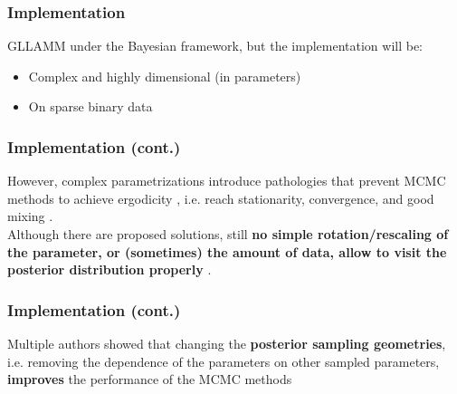 \documentclass[arial,12pt,xcolor=dvipsnames]{beamer}
\begin{document}
%
\begin{frame}
	\frametitle{Implementation}
	GLLAMM under the Bayesian framework, but the implementation will be:
	\begin{itemize}
		\item Complex and highly dimensional (in parameters)
		\item On sparse binary data
	\end{itemize}
\end{frame}
%
\begin{frame}
	\frametitle{Implementation (cont.)}
	However, complex parametrizations introduce pathologies that prevent MCMC methods to achieve ergodicity \cite{Gelfand_et_al_1995, Gelfand_et_al_1996, Papaspiliopoulos_et_al_2003, Papaspiliopoulos_et_al_2007, Betancourt_et_al_2013}, i.e. reach stationarity, convergence, and good mixing \cite{McElreath_2020}. \\
	\vspace{0.3cm} Although there are proposed solutions, still \textbf{no simple rotation/rescaling of the parameter, or (sometimes) the amount of data, allow to visit the posterior distribution properly} \cite{Betancourt_et_al_2013}.
\end{frame}
%
\begin{frame}
	\frametitle{Implementation (cont.)}
	Multiple authors showed that changing the \textbf{posterior sampling geometries}, i.e. removing the dependence of the parameters on other sampled parameters, \textbf{improves} the performance of the MCMC methods \cite{Gelfand_et_al_1995, Gelfand_et_al_1996, Papaspiliopoulos_et_al_2003, Papaspiliopoulos_et_al_2007, Betancourt_et_al_2013}
\end{frame}
%
%
\end{document}
